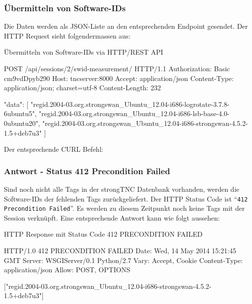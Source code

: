 \subsubsection*{Übermitteln von Software-IDs}
Die Daten werden als JSON-Liste an den entsprechenden Endpoint gesendet.
Der HTTP Request sieht folgendermassen aus:

\begin{listing}
\caption{Übermitteln von Software-IDs via HTTP/REST API}
\begin{httpcode}
POST /api/sessions/2/swid-measurement/ HTTP/1.1
Authorization: Basic cm9vdDpyb290
Host: tncserver:8000
Accept: application/json
Content-Type: application/json; charset=utf-8
Content-Length: 232

{
	"data":
	[
		"regid.2004-03.org.strongswan_Ubuntu_12.04-i686-logrotate-3.7.8-6ubuntu5",
		"regid.2004-03.org.strongswan_Ubuntu_12.04-i686-lsb-base-4.0-0ubuntu20",
		"regid.2004-03.org.strongswan_Ubuntu_12.04-i686-strongswan-4.5.2-1.5+deb7u3"
	]
}
\end{httpcode}
\end{listing}

Der entsprechende CURL Befehl:


\subsubsection*{Antwort - Status 412 Precondition Failed}

Sind noch nicht alle Tags in der strongTNC Datenbank vorhanden, werden die
Software-IDs der fehlenden Tags zurückgeliefert. Der HTTP Status Code ist
``\texttt{412 Precondition Failed}''. Es werden zu diesem Zeitpunkt noch keine
Tags mit der Session verknüpft. Eine entsprechende Antwort kann wie folgt
aussehen:

\begin{listing}
\caption{HTTP Response mit Status Code 412 PRECONDITION FAILED}
\begin{httpcode}
HTTP/1.0 412 PRECONDITION FAILED
Date: Wed, 14 May 2014 15:21:45 GMT
Server: WSGIServer/0.1 Python/2.7
Vary: Accept, Cookie
Content-Type: application/json
Allow: POST, OPTIONS

["regid.2004-03.org.strongswan_Ubuntu_12.04-i686-strongswan-4.5.2-1.5+deb7u3"]
\end{httpcode}
\end{listing}

